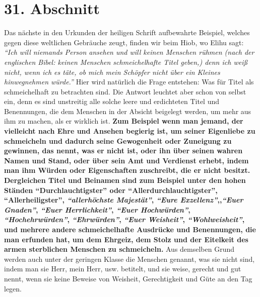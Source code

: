 \section{31. Abschnitt} \label{kap9_ab31}

Das nächste in den Urkunden der heiligen Schrift aufbewahrte Beispiel, welches
gegen diese weltlichen Gebräuche zeugt, finden wir beim Hiob, wo
Elihu sagt:
\textit{"`Ich will niemands Person ansehen und will keinen Menschen rühmen
(nach der
englischen Bibel: keinen Menschen schmeichelhafte Titel geben,) denn ich weiß
nicht, wenn ich es täte, ob mich mein Schöpfer nicht über ein Kleines
hinwegnehmen würde."'}
Hier wird natürlich die Frage
entstehen: Was für Titel als schmeichelhaft zu betrachten sind. Die Antwort
leuchtet aber schon von selbst ein, denn es sind unstreitig alle solche leere
und erdichteten Titel und Benennungen, die dem Menschen in der Absicht beigelegt
werden, um mehr aus ihm zu machen, als er wirklich ist.
\label{ref:09_31_heuchelei} \textbf{Zum Beispiel wenn man jemand,
der vielleicht nach Ehre und Ansehen begierig ist, um seiner
Eigenliebe zu
schmeicheln und dadurch seine Gewogenheit oder Zuneigung zu gewinnen, das
nennt, was er nicht ist, oder ihn über seinen wahren Namen und Stand, oder über
sein Amt und Verdienst erhebt, indem man ihm Würden oder Eigenschaften
zuschreibt, die er nicht besitzt. Dergleichen Titel und Beinamen sind zum
Beispiel unter
den hohen Ständen "`Durchlauchtigster"' oder "`Allerdurchlauchtigster"',
"`Allerheiligster"', \textit{"`allerhöchste Majestät"'}, \textit{"`Eure
Exzellenz"'},,\textit{"`Euer
Gnaden"'}, \textit{"`Euer Herrlichkeit"'}, \textit{"`Euer Hochwürden"'},
\textit{"`Hochehrwürden"'},
\textit{"`Ehrwürden"'}, \textit{"`Euer Weisheit"'}, \textit{"`Wohlweisheit"'},
und mehrere andere
schmeichelhafte Ausdrücke und Benennungen, die man erfunden hat, um dem Ehrgeiz,
dem Stolz und der Eitelkeit des armen sterblichen Menschen zu schmeicheln.}
Aus demselben Grund werden auch unter der geringen Klasse die Menschen
genannt, was sie nicht sind, indem man sie Herr, mein Herr, usw. betitelt,
und sie weise, gerecht und gut nennt, wenn sie keine Beweise von Weisheit,
Gerechtigkeit und Güte an den Tag legen.

\medskip

